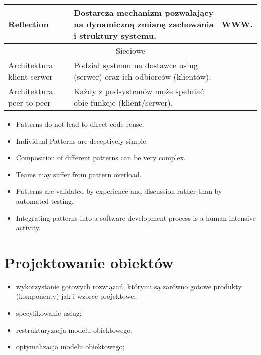 \documentclass[a4paper]{article}
\begin{document}
\begin{table}[H]
\begin{center}
\begin{tabular}{ p{} p{} p{}}
                \cmidrule(l){1-3}

                Reflection &
                Dostarcza mechanizm pozwalający na dynamiczną zmianę zachowania i struktury systemu.
                & WWW. \\

                \toprule
                \multicolumn{3}{c}{Sieciowe} \\
                \toprule

                Architektura klient-serwer
                &
                Podział systemu na dostawce usług (serwer) oraz ich odbiorców (klientów).
                & \\

                \cmidrule(l){1-3}

                Architektura peer-to-peer
                &
                Każdy z podsystemów może spełniać obie funkcje (klient/serwer).
                & \\

                \bottomrule
            \end{tabular}
        \end{center}
    \end{table}

    \begin{itemize}
        \item Patterns do not lead to direct code reuse.
        \item Individual Patterns are deceptively simple.
        \item Composition of different patterns can be very complex.
        \item Teams may suffer from pattern overload.
        \item Patterns are validated by experience and discussion
        rather than by automated testing.
        \item Integrating patterns into a software development
        process is a human-intensive activity.
    \end{itemize}


    \section{Projektowanie obiektów}
    \begin{itemize}
        \item wykorzystanie gotowych rozwiązań, którymi są zarówno
        gotowe produkty (komponenty) jak i wzorce projektowe;
        \item specyfikowanie usług;
        \item restrukturyzacja modelu obiektowego;
        \item optymalizacja modelu obiektowego;
    \end{itemize}
\end{document}
